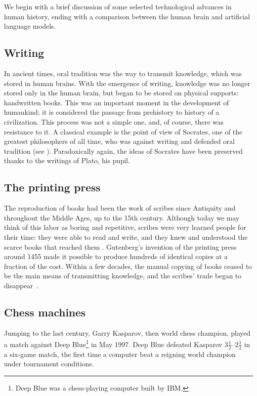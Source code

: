 \documentclass[12pt]{article}
\begin{document}

We begin with a brief discussion of some selected technological advances in human history,
ending with a comparison between the human brain and artificial language models.

\subsection{Writing}



In ancient times, oral tradition was the way to transmit knowledge, which was stored in human brains.
With the emergence of writing, knowledge was no longer stored only in the human
brain, but began to be stored on physical supports: handwritten books.
This was an important moment in the
development of humankind;
it is considered the passage from prehistory to history of a civilization.
This process was not a simple one, and, of course, there was resistance to it.
A classical example is the point of view of Socrates, one of the greatest philosophers of all time, who was against writing and defended oral tradition (see \cite{wiki1}).
Paradoxically again, the ideas of Socrates have been preserved thanks to the writings of Plato, his pupil.

\subsection{The printing press}

The reproduction of books had been the work of scribes since Antiquity and throughout the Middle Ages,
up to the 15th century.
Although today we may think of this labor as boring and repetitive,
scribes were very learned people for their time:
they were able to read and write, and they knew and understood the scarce books that reached them \cite{Vallejo2019}.
Gutenberg's invention of the printing press around 1455 made it possible to produce hundreds of identical copies
at a fraction of the cost. 
Within a few decades, the manual copying of books ceased to be the main means
of transmitting knowledge, and the scribes' trade began to disappear~\cite{Vallejo2019}.



\subsection{Chess machines}
Jumping to the last century, Garry Kasparov, then world chess champion, played a match against
Deep Blue\footnote{Deep Blue was a chess-playing computer built by IBM.}
in May 1997.
Deep Blue defeated Kasparov $3\tfrac{1}{2}$--$2\tfrac{1}{2}$ in a six-game
match,
the first time a computer beat a reigning world champion under tournament conditions.
\end{document}
